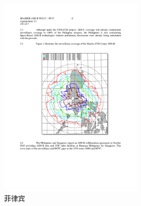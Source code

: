 \begin{figure}[htbp]
\centering
\includegraphics[width=7cm]{pic/phillipine.pdf}
\caption{菲律宾}
\label{fig:phillipine}
\end{figure}



